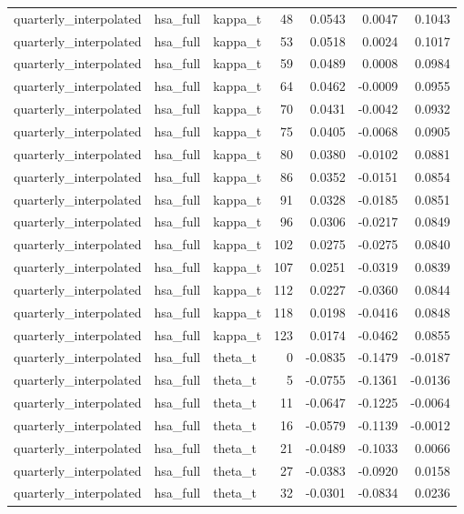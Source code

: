 \begin{tabular}{lllrrrr}
quarterly\_interpolated & hsa\_full & kappa\_t & 48 & 0.0543 & 0.0047 & 0.1043 \\
quarterly\_interpolated & hsa\_full & kappa\_t & 53 & 0.0518 & 0.0024 & 0.1017 \\
quarterly\_interpolated & hsa\_full & kappa\_t & 59 & 0.0489 & 0.0008 & 0.0984 \\
quarterly\_interpolated & hsa\_full & kappa\_t & 64 & 0.0462 & -0.0009 & 0.0955 \\
quarterly\_interpolated & hsa\_full & kappa\_t & 70 & 0.0431 & -0.0042 & 0.0932 \\
quarterly\_interpolated & hsa\_full & kappa\_t & 75 & 0.0405 & -0.0068 & 0.0905 \\
quarterly\_interpolated & hsa\_full & kappa\_t & 80 & 0.0380 & -0.0102 & 0.0881 \\
quarterly\_interpolated & hsa\_full & kappa\_t & 86 & 0.0352 & -0.0151 & 0.0854 \\
quarterly\_interpolated & hsa\_full & kappa\_t & 91 & 0.0328 & -0.0185 & 0.0851 \\
quarterly\_interpolated & hsa\_full & kappa\_t & 96 & 0.0306 & -0.0217 & 0.0849 \\
quarterly\_interpolated & hsa\_full & kappa\_t & 102 & 0.0275 & -0.0275 & 0.0840 \\
quarterly\_interpolated & hsa\_full & kappa\_t & 107 & 0.0251 & -0.0319 & 0.0839 \\
quarterly\_interpolated & hsa\_full & kappa\_t & 112 & 0.0227 & -0.0360 & 0.0844 \\
quarterly\_interpolated & hsa\_full & kappa\_t & 118 & 0.0198 & -0.0416 & 0.0848 \\
quarterly\_interpolated & hsa\_full & kappa\_t & 123 & 0.0174 & -0.0462 & 0.0855 \\
quarterly\_interpolated & hsa\_full & theta\_t & 0 & -0.0835 & -0.1479 & -0.0187 \\
quarterly\_interpolated & hsa\_full & theta\_t & 5 & -0.0755 & -0.1361 & -0.0136 \\
quarterly\_interpolated & hsa\_full & theta\_t & 11 & -0.0647 & -0.1225 & -0.0064 \\
quarterly\_interpolated & hsa\_full & theta\_t & 16 & -0.0579 & -0.1139 & -0.0012 \\
quarterly\_interpolated & hsa\_full & theta\_t & 21 & -0.0489 & -0.1033 & 0.0066 \\
quarterly\_interpolated & hsa\_full & theta\_t & 27 & -0.0383 & -0.0920 & 0.0158 \\
quarterly\_interpolated & hsa\_full & theta\_t & 32 & -0.0301 & -0.0834 & 0.0236 \\

\end{tabular}
